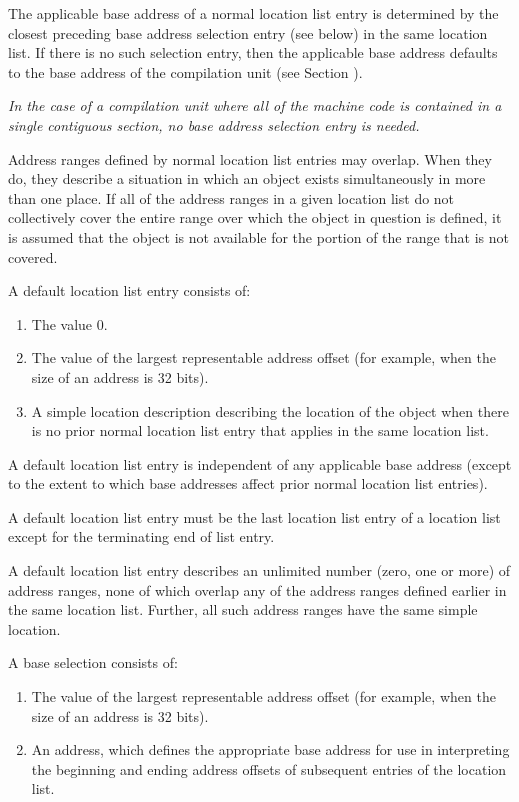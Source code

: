 The applicable base address of a normal
location list entry is
determined by the closest preceding base address selection
entry (see below) in the same location list. If there is
no such selection entry, then the applicable base address
defaults to the base address of the compilation unit (see
Section ).  

\textit{In the case of a compilation unit where all of
the machine code is contained in a single contiguous section,
no base address selection entry is needed.}

Address ranges defined by normal location list entries
may overlap. When they do, they describe a
situation in which an object exists simultaneously in more than
one place. If all of the address ranges in a given location
list do not collectively cover the entire range over which the
object in question is defined, it is assumed that the object is
not available for the portion of the range that is not covered.

A default location list entry consists of:
\begin{enumerate}[1. ]
\item The value 0.
\item The value of the largest representable address offset (for
      example, \wffffffff when the size of an address is 32 bits).
\item A simple location description describing the location of the
      object when there is no prior normal location list entry
      that applies in the same location list.
\end{enumerate}

A default location list entry is independent of any applicable
base address (except to the extent to which base addresses
affect prior normal location list entries).

A default location list entry must be the last location list
entry of a location list except for the terminating end of list
entry.

A default location list entry describes an unlimited number
(zero, one or more) of address ranges, none of which overlap
any of the address ranges defined earlier in the same location
list. Further, all such address ranges have the same simple
location.

A base 
selection 
consists of:
\begin{enumerate}[1. ]
\item The value of the largest representable 
address offset (for example, \wffffffff when the size of
an address is 32 bits).
\item An address, which defines the 
appropriate base address for use in interpreting the beginning
and ending address offsets of subsequent entries of the location list.
\end{enumerate}

